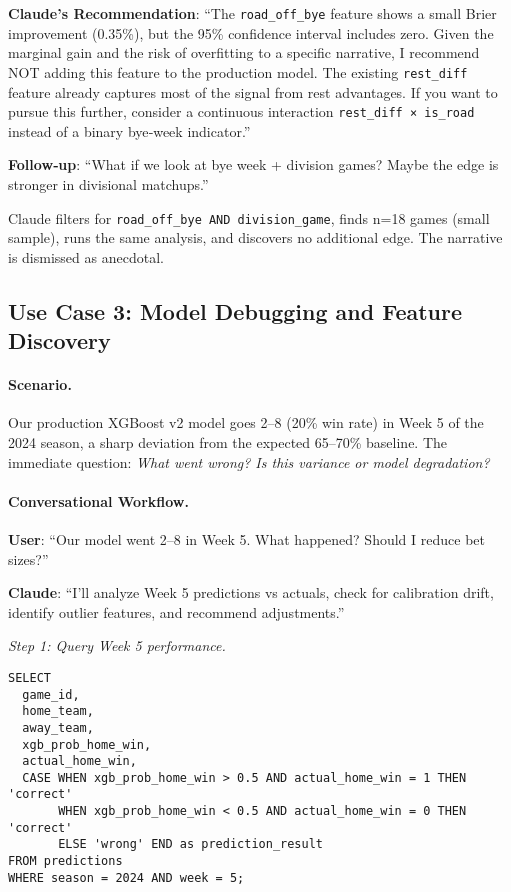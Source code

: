 \textbf{Claude's Recommendation}: ``The \texttt{road\_off\_bye} feature shows a small Brier improvement (0.35\%), but the 95\% confidence interval includes zero. Given the marginal gain and the risk of overfitting to a specific narrative, I recommend NOT adding this feature to the production model. The existing \texttt{rest\_diff} feature already captures most of the signal from rest advantages. If you want to pursue this further, consider a continuous interaction \texttt{rest\_diff × is\_road} instead of a binary bye‑week indicator.''

\textbf{Follow‑up}: ``What if we look at bye week + division games? Maybe the edge is stronger in divisional matchups.''

Claude filters for \texttt{road\_off\_bye AND division\_game}, finds n=18 games (small sample), runs the same analysis, and discovers no additional edge. The narrative is dismissed as anecdotal.

\subsection{Use Case 3: Model Debugging and Feature Discovery}
\label{subsec:use_case_debugging}

\paragraph{Scenario.}
Our production XGBoost v2 model goes 2--8 (20\% win rate) in Week 5 of the 2024 season, a sharp deviation from the expected 65--70\% baseline. The immediate question: \textit{What went wrong? Is this variance or model degradation?}

\paragraph{Conversational Workflow.}
\textbf{User}: ``Our model went 2--8 in Week 5. What happened? Should I reduce bet sizes?''

\textbf{Claude}: ``I'll analyze Week 5 predictions vs actuals, check for calibration drift, identify outlier features, and recommend adjustments.''

\textit{Step 1: Query Week 5 performance.}
\begin{verbatim}
SELECT
  game_id,
  home_team,
  away_team,
  xgb_prob_home_win,
  actual_home_win,
  CASE WHEN xgb_prob_home_win > 0.5 AND actual_home_win = 1 THEN 'correct'
       WHEN xgb_prob_home_win < 0.5 AND actual_home_win = 0 THEN 'correct'
       ELSE 'wrong' END as prediction_result
FROM predictions
WHERE season = 2024 AND week = 5;
\end{verbatim}

